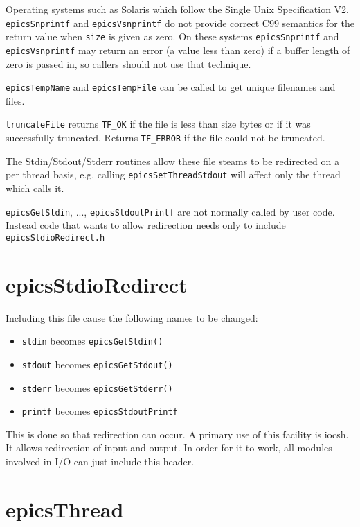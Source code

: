Operating systems such as Solaris which follow the Single Unix Specification V2, \\ \verb|epicsSnprintf| and 
\verb|epicsVsnprintf| do not provide correct C99 semantics for the return value when \verb|size| is given as zero.  On these 
systems \verb|epicsSnprintf| and \verb|epicsVsnprintf| may return an error (a value less than zero) if a buffer length of 
zero is passed in, so callers should not use that technique.

\verb|epicsTempName| and \verb|epicsTempFile| can be called to get unique filenames and files.

\verb|truncateFile| returns \verb|TF_OK| if the file is less than size bytes or if it was successfully truncated. Returns \verb|TF_ERROR| 
if the file could not be truncated. 

The Stdin/Stdout/Stderr routines allow these file steams to be redirected on a per thread basis, e.g. calling 
\verb|epicsSetThreadStdout| will affect only the thread which calls it.

\verb|epicsGetStdin|, ..., \verb|epicsStdoutPrintf| are not normally called by user code. Instead code that wants to 
allow redirection needs only to include \verb|epicsStdioRedirect.h|

\section{epicsStdioRedirect}

Including this file cause the following names to be changed:

\begin{itemize}
\item \verb|stdin| becomes \verb|epicsGetStdin()|

\item \verb|stdout| becomes \verb|epicsGetStdout()|

\item \verb|stderr| becomes \verb|epicsGetStderr()|

\item \verb|printf| becomes \verb|epicsStdoutPrintf|

\end{itemize}

This is done so that redirection can occur. A primary use of this facility is iocsh. It allows redirection of input and output. 
In order for it to work, all modules involved in I/O can just include this header.

\section{epicsThread}

